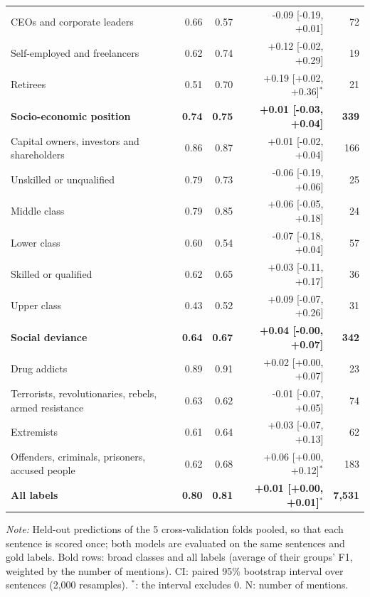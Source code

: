 \begin{table}[htbp]
\begin{threeparttable}
\begin{tabular}{l rr r r}
\quad CEOs and corporate leaders & 0.66 & 0.57 & -0.09 [-0.19, +0.01] & 72 \\
\quad Self-employed and freelancers & 0.62 & 0.74 & +0.12 [-0.02, +0.29] & 19 \\
\quad Retirees & 0.51 & 0.70 & +0.19 [+0.02, +0.36]$^{*}$ & 21 \\
\addlinespace
\textbf{Socio-economic position} & \textbf{0.74} & \textbf{0.75} & \textbf{+0.01 [-0.03, +0.04]} & \textbf{339} \\
\quad Capital owners, investors and shareholders & 0.86 & 0.87 & +0.01 [-0.02, +0.04] & 166 \\
\quad Unskilled or unqualified & 0.79 & 0.73 & -0.06 [-0.19, +0.06] & 25 \\
\quad Middle class & 0.79 & 0.85 & +0.06 [-0.05, +0.18] & 24 \\
\quad Lower class & 0.60 & 0.54 & -0.07 [-0.18, +0.04] & 57 \\
\quad Skilled or qualified & 0.62 & 0.65 & +0.03 [-0.11, +0.17] & 36 \\
\quad Upper class & 0.43 & 0.52 & +0.09 [-0.07, +0.26] & 31 \\
\addlinespace
\textbf{Social deviance} & \textbf{0.64} & \textbf{0.67} & \textbf{+0.04 [-0.00, +0.07]} & \textbf{342} \\
\quad Drug addicts & 0.89 & 0.91 & +0.02 [+0.00, +0.07] & 23 \\
\quad Terrorists, revolutionaries, rebels, armed resistance & 0.63 & 0.62 & -0.01 [-0.07, +0.05] & 74 \\
\quad Extremists & 0.61 & 0.64 & +0.03 [-0.07, +0.13] & 62 \\
\quad Offenders, criminals, prisoners, accused people & 0.62 & 0.68 & +0.06 [+0.00, +0.12]$^{*}$ & 183 \\
\midrule
\textbf{All labels} & \textbf{0.80} & \textbf{0.81} & \textbf{+0.01 [+0.00, +0.01]$^{*}$} & \textbf{7,531} \\
\bottomrule
\end{tabular}
\begin{tablenotes}[flushleft]
\footnotesize
\item \textit{Note:} Held-out predictions of the 5 cross-validation folds pooled, so that each sentence is scored once; both models are evaluated on the same sentences and gold labels. Bold rows: broad classes and all labels (average of their groups' F1, weighted by the number of mentions). CI: paired 95\% bootstrap interval over sentences (2,000 resamples). $^{*}$: the interval excludes 0. N: number of mentions.
\end{tablenotes}
\end{threeparttable}
\end{table}
